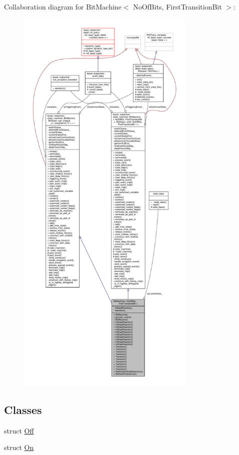Collaboration diagram for Bit\+Machine$<$ No\+Of\+Bits, First\+Transition\+Bit $>$\+:
\nopagebreak
\begin{figure}[H]
\begin{center}
\leavevmode
\includegraphics[height=550pt]{struct_bit_machine__coll__graph}
\end{center}
\end{figure}
\subsection*{Classes}
\begin{DoxyCompactItemize}
\item 
struct \mbox{\hyperlink{struct_bit_machine_1_1_off}{Off}}
\item 
struct \mbox{\hyperlink{struct_bit_machine_1_1_on}{On}}
\end{DoxyCompactItemize}
